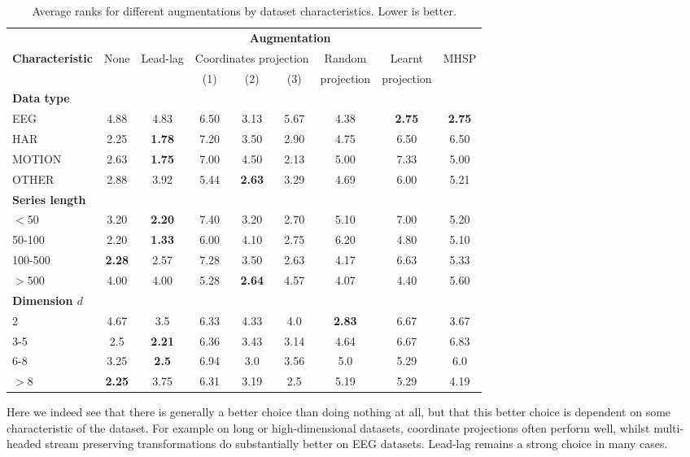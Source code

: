 \documentclass{article}
\theoremstyle{definition}
\theoremstyle{remark}
\begin{document}
	\begin{table}[t]
	\centering
	\caption{Average ranks for different augmentations by dataset characteristics. Lower is better.}
	\label{tab:augs_ranks_by_type}
	\begin{tabular}{lcccccccc}
	\toprule
	& \multicolumn{8}{c}{\textbf{Augmentation}}\\
	 \cmidrule{2-9}
	 \multirow{2}{*}{\textbf{Characteristic}}&\multirow{2}{*}{None}& \multirow{2}{*}{Lead-lag}& \multicolumn{3}{c}{Coordinates projection} & Random& Learnt &  \multirow{2}{*}{MHSP}    \\
	 & & & (1) & (2) &(3) & projection &  projection \\
	\midrule
	\textbf{Data type} \\
	\cmidrule{1-1}
	EEG & 4.88 & 4.83 & 6.50 & 3.13 & 5.67 & 4.38 & \textbf{2.75} & \textbf{2.75} \\
	HAR & 2.25 & \textbf{1.78} & 7.20 & 3.50 & 2.90 & 4.75 & 6.50 & 6.50 \\
	MOTION & 2.63 & \textbf{1.75} & 7.00 & 4.50 & 2.13 & 5.00 & 7.33 & 5.00 \\
	OTHER & 2.88 & 3.92 & 5.44 & \textbf{2.63} & 3.29 & 4.69 & 6.00 & 5.21 \\
	\midrule
	\textbf{Series length}\\
	\cmidrule{1-1}
	$<$50 & 3.20 & \textbf{2.20} & 7.40 & 3.20 & 2.70 & 5.10 & 7.00 & 5.20 \\
	50-100 & 2.20 & \textbf{1.33} & 6.00 & 4.10 & 2.75 & 6.20 & 4.80 & 5.10 \\
	100-500 & \textbf{2.28} & 2.57 & 7.28 & 3.50 & 2.63 & 4.17 & 6.63 & 5.33 \\
	$>$500 & 4.00 & 4.00 & 5.28 & \textbf{2.64} & 4.57 & 4.07 & 4.40 & 5.60 \\
	\midrule
	\textbf{Dimension $d$}\\
	\cmidrule{1-1}
	2 & 4.67 & 3.5 & 6.33 & 4.33 & 4.0 & \textbf{2.83} & 6.67 & 3.67 \\
	3-5 & 2.5 & \textbf{2.21} & 6.36 & 3.43 & 3.14 & 4.64 & 6.67 & 6.83 \\
	6-8 & 3.25 & \textbf{2.5} & 6.94 & 3.0 & 3.56 & 5.0 & 5.29 & 6.0 \\
	$>$8 & \textbf{2.25} & 3.75 & 6.31 & 3.19 & 2.5 & 5.19 & 5.29 & 4.19\\
	\bottomrule           
	\end{tabular}
	\end{table}

	Here we indeed see that there is generally a better choice than doing nothing at all, but that this better choice is dependent on some characteristic of the dataset. For example on long or high-dimensional datasets, coordinate projections often perform well, whilst multi-headed stream preserving transformations do substantially better on EEG datasets. Lead-lag remains a strong choice in many cases.
	
\end{document}
